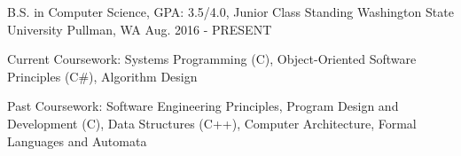 \begin{cventries}
  \cventry
    {B.S. in Computer Science, GPA: 3.5/4.0, Junior Class Standing}
    {Washington State University}
    {Pullman, WA}
    {Aug. 2016 - PRESENT}
    {
      \begin{cvitems}
      \item {Current Coursework: Systems Programming (C), Object-Oriented Software Principles (C\#), Algorithm Design}
        \item {Past Coursework: Software Engineering Principles, Program Design and Development (C), Data Structures (C++), Computer Architecture, Formal Languages and Automata}
      \end{cvitems}
    }
\end{cventries}